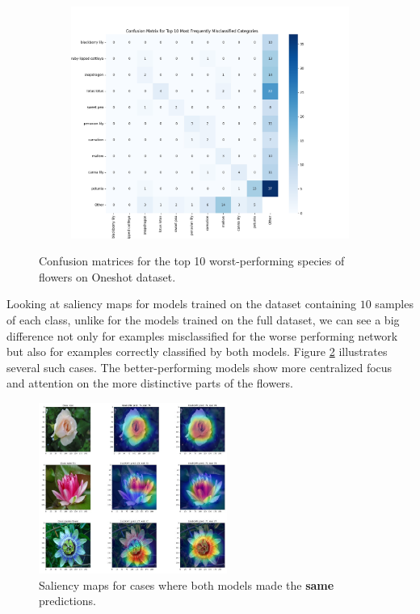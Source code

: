 \begin{figure}[!htb]
\begin{subfigure}[b]{0.49\textwidth}
        \includegraphics[width=\textwidth]{Images/oneshot/cm/adv_aug_cm.png}
    \end{subfigure}
    \caption{Confusion matrices for the top 10 worst-performing species of flowers on Oneshot dataset.}
    \label{fig:confMatricesOneshot}
\end{figure}

Looking at saliency maps for models trained on the dataset containing $10$ samples of each class, unlike for the models trained on the full dataset, we can see a big difference not only for examples misclassified for the worse performing network but also for examples correctly classified by both models. Figure \ref{fig:saliencySummary1} illustrates several such cases. The better-performing models show more centralized focus and attention on the more distinctive parts of the flowers.


\begin{figure}[!h]
    \centering
    \includegraphics[width=0.55\textwidth]{Images/saliency-oneshot/both_ok_summary.jpg}
    \caption{Saliency maps for cases where both models made the \textbf{same} predictions.}
    \label{fig:saliencySummary1}
\end{figure}

